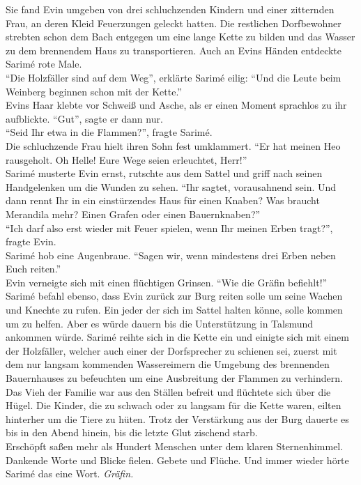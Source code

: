 Sie fand Evin umgeben von drei schluchzenden Kindern und einer zitternden Frau, an deren Kleid 
Feuerzungen geleckt hatten. Die restlichen Dorfbewohner strebten schon dem Bach entgegen um eine 
lange Kette zu bilden und das Wasser zu dem brennendem Haus zu transportieren. Auch an Evins Händen 
entdeckte Sarimé rote Male.\\
``Die Holzfäller sind auf dem Weg'', erklärte Sarimé eilig: ``Und die Leute beim Weinberg beginnen 
schon mit der Kette.''\\
Evins Haar klebte vor Schweiß und Asche, als er einen Moment sprachlos zu ihr aufblickte. ``Gut'', 
sagte er dann nur.\\
``Seid Ihr etwa in die Flammen?'', fragte Sarimé.\\
Die schluchzende Frau hielt ihren Sohn fest umklammert. ``Er hat meinen Heo rausgeholt. Oh 
Helle! Eure Wege seien erleuchtet, Herr!''\\
Sarimé musterte Evin ernst, rutschte aus dem Sattel und griff nach seinen Handgelenken um die 
Wunden zu sehen. ``Ihr sagtet, vorausahnend sein. Und dann rennt Ihr in ein einstürzendes Haus für 
einen Knaben? Was braucht Merandila mehr? Einen Grafen oder einen Bauernknaben?''\\
``Ich darf also erst wieder mit Feuer spielen, wenn Ihr meinen Erben tragt?'', fragte Evin.\\
Sarimé hob eine Augenbraue. ``Sagen wir, wenn mindestens drei Erben neben Euch reiten.''\\
Evin verneigte sich mit einen flüchtigen Grinsen. ``Wie die Gräfin befiehlt!''\\
Sarimé befahl ebenso, dass Evin zurück zur Burg reiten solle um seine Wachen und Knechte zu rufen. 
Ein jeder der sich im Sattel halten könne, solle kommen um zu helfen. Aber es würde dauern bis die 
Unterstützung in Talsmund ankommen würde. Sarimé reihte sich in die Kette ein und einigte sich mit 
einem der Holzfäller, welcher auch einer der Dorfsprecher zu schienen sei, zuerst mit dem nur 
langsam kommenden Wassereimern die Umgebung des brennenden Bauernhauses zu befeuchten um eine 
Ausbreitung der Flammen zu verhindern. Das Vieh der Familie war aus den Ställen befreit und 
flüchtete sich über die Hügel. Die Kinder, die zu schwach oder zu langsam für die Kette waren, 
eilten hinterher um die Tiere zu hüten. Trotz der Verstärkung aus der Burg dauerte es bis in den 
Abend hinein, bis die letzte Glut zischend starb.\\
Erschöpft saßen mehr als Hundert Menschen unter dem klaren Sternenhimmel. Dankende Worte und Blicke 
fielen. Gebete und Flüche. Und immer wieder hörte Sarimé das eine Wort. \textit{Gräfin.}\\


